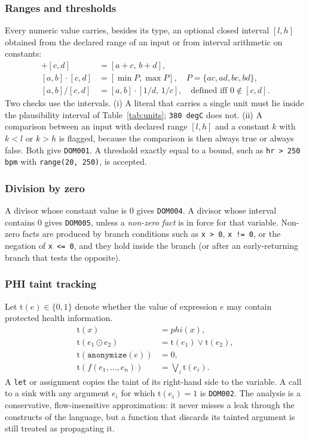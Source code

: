\documentclass[conference]{IEEEtran}
\newcommand{\code}[1]{\texttt{#1}}
\begin{document}
\subsubsection{Ranges and thresholds}

Every numeric value carries, besides its type, an optional closed interval $[l,h]$ obtained from the declared range
of an input or from interval arithmetic on constants:
\begin{align}
[a,b]+[c,d]&=[a+c,\,b+d],\\
[a,b]\cdot[c,d]&=[\min P,\max P],\quad P=\{ac,ad,bc,bd\},\\
[a,b]/[c,d]&=[a,b]\cdot[1/d,\,1/c],\quad\text{defined iff }0\notin[c,d].
\end{align}
Two checks use the intervals. (i) A literal that carries a single unit must lie inside the plausibility interval of
Table~\ref{tab:units}; \code{380 degC} does not. (ii) A comparison between an input with declared range $[l,h]$ and a
constant $k$ with $k<l$ or $k>h$ is flagged, because the comparison is then always true or always false. Both give
\code{DOM001}. A threshold exactly equal to a bound, such as \code{hr > 250 bpm} with \code{range(20, 250)}, is accepted.

\subsubsection{Division by zero}

A divisor whose constant value is $0$ gives \code{DOM004}. A divisor whose interval contains $0$ gives \code{DOM005},
unless a \emph{non-zero fact} is in force for that variable. Non-zero facts are produced by branch conditions such as
\code{x > 0}, \code{x != 0}, or the negation of \code{x <= 0}, and they hold inside the branch (or after an
early-returning branch that tests the opposite).

\subsubsection{PHI taint tracking}

Let $\mathrm{t}(e)\in\{0,1\}$ denote whether the value of expression $e$ may contain protected health information.
\begin{align}
\mathrm{t}(x)&=\mathit{phi}(x),\\
\mathrm{t}(e_1\odot e_2)&=\mathrm{t}(e_1)\lor\mathrm{t}(e_2),\\
\mathrm{t}(\texttt{anonymize}(e))&=0,\\
\mathrm{t}(f(e_1,\dots,e_n))&=\textstyle\bigvee_i \mathrm{t}(e_i).
\end{align}
A \code{let} or assignment copies the taint of its right-hand side to the variable. A call to a sink with any argument
$e_i$ for which $\mathrm{t}(e_i)=1$ is \code{DOM002}. The analysis is a conservative, flow-insensitive approximation:
it never misses a leak through the constructs of the language, but a function that discards its tainted argument
is still treated as propagating it.
\end{document}
